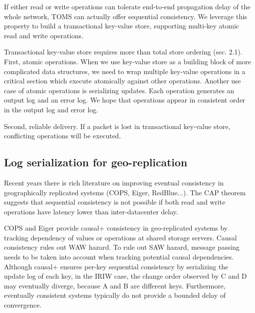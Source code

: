 
If either read or write operations can tolerate end-to-end propagation delay of the whole network, TOMS can actually offer sequential consistency. We leverage this property to build a transactional key-value store, supporting multi-key atomic read and write operations.

Transactional key-value store requires more than total store ordering (sec. 2.1). First, atomic operations. When we use key-value store as a building block of more complicated data structures, we need to wrap multiple key-value operations in a critical section which execute atomically against other operations.  Another use case of atomic operations is serializing updates. Each operation generates an output log and an error log. We hope that operations appear in consistent order in the output log and error log.

Second, reliable delivery. If a packet is lost in transactional key-value store, conflicting operations will be executed.



\subsection{Log serialization for geo-replication}
\label{subsec:log-serialization}

Recent years there is rich literature on improving eventual consistency in geographically replicated systems (COPS, Eiger, RedBlue...). The CAP theorem suggests that sequential consistency is not possible if both read and write operations have latency lower than inter-datacenter delay.

COPS and Eiger provide causal+ consistency in geo-replicated systems by tracking dependency of values or operations at shared storage servers. Causal consistency rules out WAW hazard. To rule out SAW hazard, message passing needs to be taken into account when tracking potential causal dependencies. Although causal+ ensures per-key sequential consistency by serializing the update log of each key, in the IRIW case, the change order observed by C and D may eventually diverge, because A and B are different keys. Furthermore, eventually consistent systems typically do not provide a bounded delay of convergence.

